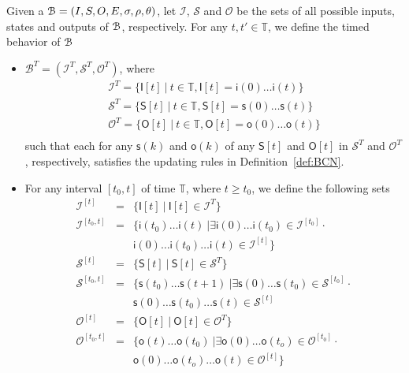 Given a {\BCN} ${\mathcal{B}} = (I,S,O, E, \sigma, \rho,\theta)$, let $\mathcal{I}$, $\mathcal{S}$ and $\mathcal{O}$ be the sets of all possible inputs, states and outputs of ${\mathcal{B}}$, respectively. For any $t,t' \in \mathbb{T}$, we define the timed behavior of ${\mathcal{B}}$
\begin{itemize}
\item $\mathcal{B}^T = (\mathcal{I}^T, \mathcal{S}^T, \mathcal{O}^T)$,  where 
{\small \[\begin{array}{llll}
\mathcal{I}^T =\{\mathsf{I}[t]~|~ t\in \mathbb{T}, \mathsf{I}[t]=\mathsf{i}(0)\ldots \mathsf{i}(t)\}\\
\mathcal{S}^T =\{\mathsf{S}[t]~|~ t\in \mathbb{T}, \mathsf{S}[t]=\mathsf{s}(0)\ldots \mathsf{s}(t)\}\\
\mathcal{O}^T =\{\mathsf{O}[t]~|~ t\in \mathbb{T}, \mathsf{O}[t]=\mathsf{o}(0)\ldots \mathsf{o}(t)\}\\
\end{array}
\]} such that each for any $\mathsf{s}(k)$ and $\mathsf{o}(k)$ of any $\mathsf{S}[t]$ and 
$\mathsf{O}[t]$ in $\mathcal{S}^T$ and $\mathcal{O}^T$, respectively,   satisfies the updating rules in Definition~\ref{def:BCN}.
\item For any interval  $[t_0,t]$ of time $\mathbb{T}$, where $t\geq t_0$, we define the following sets 
\[\begin{array}{llllll}
\mathcal{I}^{[t]} &=& \{\mathsf{I}[t] ~|~ \mathsf{I}[t]\in \mathcal{I}^T\}\\
\mathcal{I}^{[t_0,t]} &=& \{\mathsf{i}(t_0)\ldots \mathsf{i}(t)~|\exists \mathsf{i}(0)\ldots \mathsf{i}(t_0)\in \mathcal{I}^{[t_0]}\cdot\\
&& \mathsf{i}(0)\ldots \mathsf{i}(t_0) \ldots \mathsf{i}(t)\in \mathcal{I}^{[t]}\} \\
\mathcal{S}^{[t]} &=& \{\mathsf{S}[t] ~|~ \mathsf{S}[t]\in \mathcal{S}^T\}\\
\mathcal{S}^{[t_0,t]} &=& \{\mathsf{s}(t_0)\ldots \mathsf{s}(t+1)~|\exists \mathsf{s}(0)\ldots \mathsf{s}(t_0)\in \mathcal{S}^{[t_0]}\cdot\\
&& \mathsf{s}(0)\ldots \mathsf{s}(t_0) \ldots \mathsf{s}(t)\in \mathcal{S}^{[t]} \\
\mathcal{O}^{[t]} &=& \{\mathsf{O}[t] ~|~ \mathsf{O}[t]\in \mathcal{O}^T\}\\
\mathcal{O}^{[t_0,t]} &=& \{\mathsf{o}(t)\ldots \mathsf{o}(t_0)~|\exists \mathsf{o}(0)\ldots \mathsf{o}(t_o)\in \mathcal{O}^{[t_0]}\cdot\\
&& \mathsf{o}(0)\ldots \mathsf{o}(t_o) \ldots \mathsf{o}(t)\in \mathcal{O}^{[t]} \}\\
\end{array}
\]
\end{itemize} 
